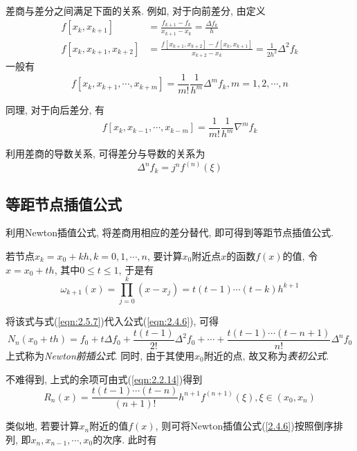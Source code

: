 差商与差分之间满足下面的关系. 例如, 对于向前差分, 由定义
\begin{align*}
    f[x_k,x_{k+1}]&=\frac{f_{k+1}-f_k}{x_{k+1}-x_k}=\frac{\Delta f_k}{h}\\
    f[x_k,x_{k+1},x_{k+2}]&=\frac{f[x_{k+1},x_{k+2}]-f[x_k,x_{k+1}]}{x_{k+2}-x_k}=\frac{1}{2h^2}\Delta^2f_k
\end{align*}
一般有
\begin{equation}\label{eqn:2.5.7}
    f[x_k,x_{k+1},\cdots,x_{k+m}]=\frac{1}{m!}\frac{1}{h^m}\Delta^mf_k, m=1,2,\cdots,n
\end{equation}

同理, 对于向后差分, 有
\begin{equation}\label{eqn:2.5.8}
    f[x_k,x_{k-1},\cdots,x_{k-m}]=\frac{1}{m!}\frac{1}{h^m}\nabla^mf_k
\end{equation}

利用差商的导数关系, 可得差分与导数的关系为
\begin{equation*}
    \Delta^nf_k=j^nf^{(n)}(\xi)
\end{equation*}

\subsection{等距节点插值公式}

利用Newton插值公式, 将差商用相应的差分替代, 即可得到等距节点插值公式. 

若节点$x_k=x_0+kh, k=0,1,\cdots,n$, 要计算$x_0$附近点$x$的函数$f(x)$的值, 令$x=x_0+th$, 其中$0\le t\le1$, 于是有
\begin{equation*}
    \omega_{k+1}(x)=\prod_{j=0}^k(x-x_j)=t(t-1)\cdots(t-k)h^{k+1}
\end{equation*}

将该式与式(\ref{eqn:2.5.7})代入公式(\ref{eqn:2.4.6}), 可得
\begin{equation*}
    N_n(x_0+th)=f_0+t\Delta f_0+\frac{t(t-1)}{2!}\Delta^2f_0+\cdots+\frac{t(t-1)\cdots(t-n+1)}{n!}\Delta^nf_0
\end{equation*}
上式称为\emph{Newton前插公式}. 同时, 由于其使用$x_0$附近的点, 故又称为\emph{表初公式}.

不难得到, 上式的余项可由式(\ref{eqn:2.2.14})得到
\begin{equation*}
    R_n(x)=\frac{t(t-1)\cdots(t-n)}{(n+1)!}h^{n+1}f^{(n+1)}(\xi), \xi\in(x_0,x_n)
\end{equation*}

类似地, 若要计算$x_n$附近的值$f(x)$, 则可将Newton插值公式(\ref{2.4.6})按照倒序排列, 即$x_n,x_{n-1},\cdots,x_0$的次序. 此时有

